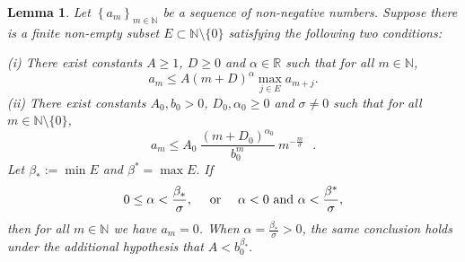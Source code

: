 \documentclass[12pt]{amsart}
\newtheorem{lemma}[theorem]{Lemma}
\begin{document}
\begin{lemma}
	\label{lemmaSeq} Let $\left\{  a_{m}\right\}  _{m\in\mathbb{N}}$ be a sequence
	of non-negative numbers. Suppose there is a finite non-empty subset
	$E\subset\mathbb{N}\setminus\{0\}$ satisfying the following two conditions:
	
	(i) There exist constants $A \ge 1$,   $D \ge 0$ and $\alpha\in\mathbb{R}$ such that for
	all $m\in\mathbb{N}$,
	\[
	a_{m}\leq A\left(  m+D\right)  ^{\alpha}\max_{j\in E}a_{m+j}.
	\]
	(ii) There exist constants $A_{0},b_{0}>0$,  $D_{0},\alpha_{0}\geq0$ and
	$\sigma\neq0$ such that for all $m\in\mathbb{N}\setminus\{0\}$,
	\[
	a_{m}\leq A_{0}\ \frac{\left(  m+D_{0}\right)  ^{\alpha_{0}}}{b_{0}^{m}%
	}\ m^{-\frac{m}{\sigma}}\text{ }.
	\]
	Let $\beta_{\ast}:=\min E$ and $\beta^{\ast}=\max E.$ If
	\[
	0\leq\alpha<\frac{\beta_{\ast}}{\sigma},\text{ \quad or }\quad\alpha<0\text{
		and }\alpha<\frac{\beta^{\ast}}{\sigma},
	\]
	then for all $m\in\mathbb{N}$ we have $a_{m}=0$. When $\alpha
	=\frac{\beta_{\ast}}{\sigma} > 0$, the same conclusion holds under the
	additional hypothesis that $A < b_{0}^{\beta_{\ast}}.$
\end{lemma}
\end{document}
